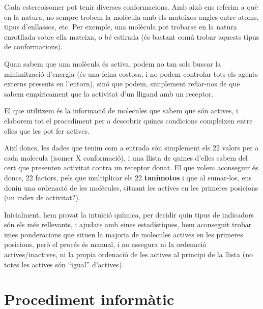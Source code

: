 \documentclass[titlepage,a4paper,12pt]{book}
\begin{document}
Cada estereoisomer pot tenir diverses conformacions.  Amb això ens referim a què
en la natura, no sempre trobem la molècula amb els mateixos angles entre atoms,
tipus d'enllassos, etc. Per exemple, una molècula pot trobarse en la natura
enrotllada sobre ella mateixa, o bé estirada (és bastant comú trobar aquests
tipus de conformacions).


Quan sabem que una molècula és activa, podem no tan sols buscar la minimització
d'energia (és una feina costosa, i no podem controlar tots els agents externs
presents en l'entorn), sinó que podem, simplement refiar-nos de que sabem
empíricament que la activitat d'un lligand amb un receptor.



El que utilitzem és la informació de molecules que sabem que són actives,
i elaborem tot el procediment per a descobrir quines condicions compleixen entre
elles que les pot fer actives.

Així doncs, les dades que tenim com a entrada són simplement els 22 valors per a
cada molecula (isomer X conformació), i una llista de quines d'elles sabem del
cert que presenten activitat contra un receptor donat.  El que volem aconseguir
és doncs, 22 factors, pels que multiplicar els 22 \textbf{tanimotos} i que al
sumar-los, ens donin una ordenació de les molècules, situant les actives en
les primeres posicions (un index de activitat?).


Inicialment, hem provat la intuició química, per decidir quin tipus de
indicadors són els més rellevants, i ajudats amb eines estadístiques, hem
aconseguit trobar unes ponderacions que situen la majoria de molecules actives
en les primeres posicions, però el procés és manual, i no assegura ni la
ordenació actives/inactives, ni la propia ordenació de les actives al principi
de la llista (no totes les actives són ``igual'' d'actives).


\section{Procediment informàtic} %
\label{sec:Procediment informatic}
\end{document}
